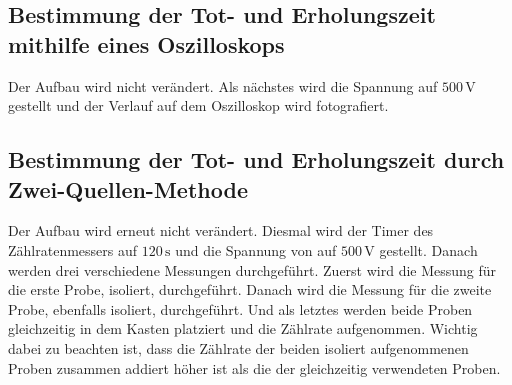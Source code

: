 \subsection{Bestimmung der Tot- und Erholungszeit mithilfe eines Oszilloskops}

\begin{flushleft}
    Der Aufbau wird nicht verändert.
    Als nächstes wird die Spannung auf $500\,\unit{\volt}$ gestellt und der Verlauf auf dem Oszilloskop wird fotografiert.
\end{flushleft}

\subsection{Bestimmung der Tot- und Erholungszeit durch Zwei-Quellen-Methode}

\begin{flushleft}
    Der Aufbau wird erneut nicht verändert.
    Diesmal wird der Timer des Zählratenmessers auf $120\,\unit{\second}$ und die Spannung von auf $500\,\unit{\volt}$ gestellt.
    Danach werden drei verschiedene Messungen durchgeführt.
    Zuerst wird die Messung für die erste Probe, isoliert, durchgeführt.
    Danach wird die Messung für die zweite Probe, ebenfalls isoliert, durchgeführt.
    Und als letztes werden beide Proben gleichzeitig in dem Kasten platziert und die Zählrate aufgenommen.
    Wichtig dabei zu beachten ist, dass die Zählrate der beiden isoliert aufgenommenen Proben zusammen addiert höher ist als die der gleichzeitig verwendeten Proben. 
\end{flushleft}